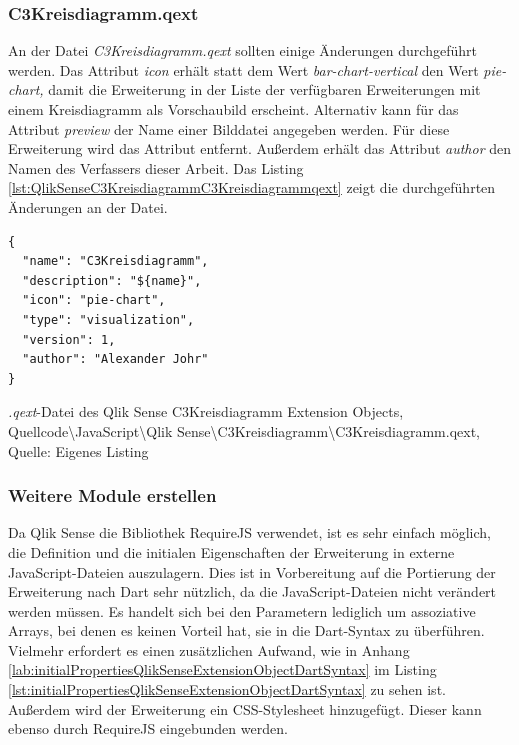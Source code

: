 \subsubsection{C3Kreisdiagramm.qext}


An der Datei \textit{C3Kreisdiagramm.qext} sollten einige Änderungen durchgeführt werden. Das Attribut \textit{icon} erhält statt dem Wert \textit{bar-chart-vertical} den Wert \textit{pie-chart,} damit die Erweiterung in der Liste der verfügbaren Erweiterungen mit einem Kreisdiagramm als Vorschaubild erscheint. Alternativ kann für das Attribut \textit{preview} der Name einer Bild\-datei angegeben werden. Für diese Erweiterung wird das Attribut entfernt. Außerdem erhält das Attribut \textit{author} den Namen des Verfassers dieser Arbeit. Das Listing \ref{lst:QlikSenseC3KreisdiagrammC3Kreisdiagrammqext} zeigt die durchgeführten Änderungen an der Datei.

\begin{listing}[htbp]
\begin{verbatim}
{
  "name": "C3Kreisdiagramm",
  "description": "${name}",
  "icon": "pie-chart",
  "type": "visualization",
  "version": 1,
  "author": "Alexander Johr"
}
\end{verbatim}
\caption[\textit{.qext}-Datei des Qlik Sense C3Kreisdiagramm Extension Objects]{\textit{.qext}-Datei des Qlik Sense C3Kreisdiagramm Extension Objects, \\Quellcode\textbackslash{}JavaScript\textbackslash{}Qlik Sense\textbackslash{}C3Kreisdiagramm\textbackslash{}C3Kreisdiagramm.qext, \\Quelle: Eigenes Listing}
\label{lst:QlikSenseC3KreisdiagrammC3Kreisdiagrammqext}
\end{listing}

\subsubsection{Weitere Module erstellen}
\label{lab:QlikSenseWeitereModuleErstellen} 

Da Qlik Sense die Bibliothek RequireJS verwendet, ist es sehr einfach möglich, die Definition und die initialen Eigenschaften der Erweiterung in externe JavaScript-Dateien auszulagern. Dies ist in Vorbereitung auf die Portierung der Erweiterung nach Dart sehr nützlich, da die JavaScript-Dateien nicht verändert werden müssen. Es handelt sich bei den Parametern lediglich um assoziative Arrays, bei denen es keinen Vorteil hat, sie in die Dart-Syntax zu überführen. Vielmehr erfordert es einen zusätzlichen Aufwand, wie in Anhang \ref{lab:initialPropertiesQlikSenseExtensionObjectDartSyntax} im Listing \ref{lst:initialPropertiesQlikSenseExtensionObjectDartSyntax} zu sehen ist. Außerdem wird der Erweiterung ein CSS-Stylesheet hinzugefügt. Dieser kann ebenso durch RequireJS eingebunden werden.


